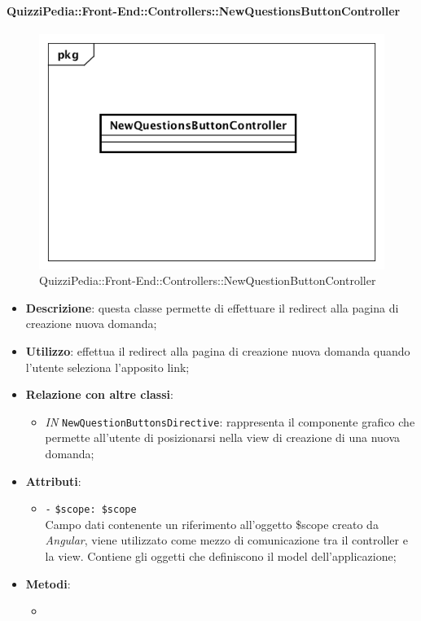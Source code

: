 \paragraph{QuizziPedia::Front-End::Controllers::NewQuestionsButtonController}
\begin{figure} [ht]
	\centering
	\includegraphics[scale=0.45]{UML/Classi/Front-End/QuizziPedia_Front-end_Controller_NewQuestionsButtonController.png}
	\caption{QuizziPedia::Front-End::Controllers::NewQuestionButtonController}
\end{figure} \FloatBarrier
\begin{itemize}
	\item \textbf{Descrizione}: questa classe permette di effettuare il redirect alla pagina di creazione nuova domanda;
	\item \textbf{Utilizzo}: effettua il redirect alla pagina di creazione nuova domanda quando l'utente seleziona l'apposito link;
	\item \textbf{Relazione con altre classi}:
	\begin{itemize}
		\item \textit{IN} \texttt{NewQuestionButtonsDirective}: rappresenta il componente grafico che permette all'utente di posizionarsi nella view di creazione di una nuova domanda; 
	\end{itemize}
	\item \textbf{Attributi}:
	\begin{itemize}
		\item \texttt{-} \texttt{\$scope: \$scope} \\
		Campo dati contenente un riferimento all’oggetto \$scope creato da \textit{Angular}, viene utilizzato come mezzo di comunicazione tra il controller e la view. Contiene gli oggetti che definiscono il model dell’applicazione;
	\end{itemize}
	\item \textbf{Metodi}:
	\begin{itemize}
		\item 
	\end{itemize}
\end{itemize}

